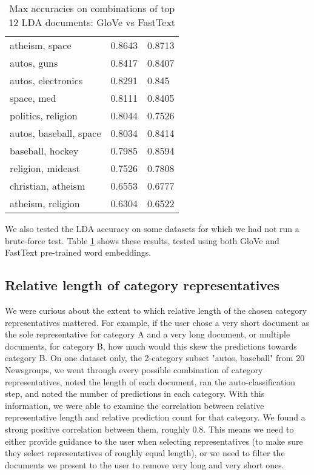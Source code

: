 \documentclass{article} %
\begin{document}
\begin{table}[]
\begin{tabular}{lll}
atheism, space                              & 0.8643       & 0.8713                 \\
autos, guns                                 & 0.8417       & 0.8407                 \\
autos, electronics                          & 0.8291       & 0.845                  \\
space, med                                  & 0.8111       & 0.8405                 \\
politics, religion                          & 0.8044       & 0.7526                 \\
autos, baseball, space                       & 0.8034       & 0.8414                 \\
baseball, hockey                            & 0.7985       & 0.8594                 \\
religion, mideast                           & 0.7526       & 0.7808                 \\
christian, atheism                          & 0.6553       & 0.6777                 \\
atheism, religion                           & 0.6304       & 0.6522                 \\
\bottomrule
\end{tabular}
\caption{Max accuracies on combinations of top 12 LDA documents: GloVe vs FastText}\label{lda_fasttext}
\end{table}


We also tested the LDA accuracy on some datasets for which we had not run a brute-force test. Table \ref{lda_fasttext} shows these results, tested using both GloVe and FastText pre-trained word embeddings.

\subsection{Relative length of category representatives}
We were curious about the extent to which relative length of the chosen category representatives mattered. For example, if the user chose a very short document as the sole representative for category A and a very long document, or multiple documents, for category B, how much would this skew the predictions towards category B. On one dataset only, the 2-category subset "autos, baseball" from 20 Newsgroups, we went through every possible combination of category representatives, noted the length of each document, ran the auto-classification step, and noted the number of predictions in each category. With this information, we were able to examine the correlation between relative representative length and relative prediction count for that category. We found a strong positive correlation between them, roughly 0.8. This means we need to either provide guidance to the user when selecting representatives (to make sure they select representatives of roughly equal length), or we need to filter the documents we present to the user to remove very long and very short ones.
\end{document}
